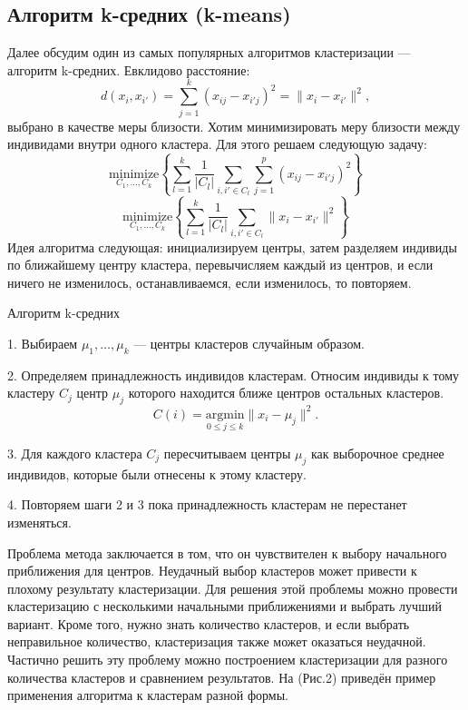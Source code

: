 \documentclass[article, 10pt]{disser}
\begin{document}
\subsection{Алгоритм k-средних (k-means)}
Далее обсудим один из самых популярных алгоритмов кластеризации --- алгоритм k-средних. Евклидово расстояние: 
\begin{equation}
d(x_{i}, x_{i'}) = \sum\limits_{j=1}^k (x_{ij} - x_{i'j})^{2} = \| x_{i} - x_{i'} \|^{2},
\end{equation}
выбрано в качестве меры близости. Хотим минимизировать меру близости между индивидами внутри одного кластера. Для этого решаем следующую задачу: 
\begin{equation}
\underset{C_{1},\ldots, C_{k}}{\text{minimize}} \left\{ \sum\limits_{l=1}^k \frac{1}{|C_{l}|}  \sum\limits_{i,i' \in C_{l}} \sum\limits_{j = 1}^{p} (x_{ij} - x_{i'j})^{2} \right\} 
\end{equation}
$$
\underset{C_{1},\ldots, C_{k}}{\text{minimize}} \left\{ \sum\limits_{l=1}^k \frac{1}{|C_{l}|} \sum\limits_{i,i' \in C_{l}}   \| x_{i} - x_{i'} \|^{2} \right\}
$$
Идея алгоритма следующая: инициализируем центры, затем разделяем индивиды по ближайшему центру кластера, перевычисляем каждый из центров, и если ничего не изменилось, останавливаемся, если изменилось, то повторяем.

\begin{algorithm}
\caption{Алгоритм k-средних}\label{alg:cap}
1. Выбираем $\mu_{1},\ldots, \mu_{k}$ --- центры кластеров случайным образом.

2. Определяем принадлежность индивидов кластерам. Относим индивиды к тому кластеру $C_{j}$ центр $\mu_{j}$ которого находится ближе центров остальных кластеров.  $$C(i) = \underset{0 \leq j \leq  k}{\text{argmin}} \|x_{i} - \mu_{j} \|^{2}.$$

3. Для каждого кластера $C_{j}$ пересчитываем центры $\mu_{j}$ как выборочное среднее индивидов, которые были отнесены к этому кластеру.

4. Повторяем шаги 2 и 3 пока принадлежность кластерам не перестанет изменяться.
\end{algorithm}
Проблема метода заключается в том, что он чувствителен к выбору начального приближения для центров. Неудачный выбор кластеров может привести к плохому результату кластеризации. Для решения этой проблемы можно провести кластеризацию с несколькими начальными приближениями и выбрать лучший вариант. Кроме того,  нужно знать количество кластеров, и если выбрать неправильное количество, кластеризация также может оказаться неудачной. Частично решить эту проблему можно построением кластеризации для разного количества кластеров и сравнением результатов. На (Рис.2) приведён пример применения алгоритма к кластерам разной формы.
\end{document}
